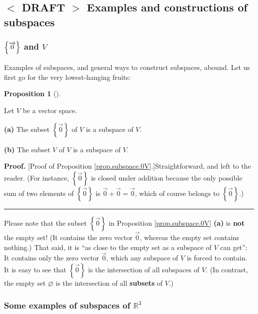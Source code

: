 \documentclass[numbers=enddot,12pt,final,onecolumn,notitlepage]{scrartcl}%
\theoremstyle{definition}
\newtheorem{prop}[theo]{Proposition}
\newenvironment{proposition}[1][]
{\begin{prop}[#1]\begin{leftbar}}
{\end{leftbar}\end{prop}}
\newenvironment{proof}[1][Proof]{\noindent\textbf{#1.} }{\ \rule{0.5em}{0.5em}}
\begin{document}
\subsection{%
$<$%
DRAFT%
$>$
Examples and constructions of subspaces}

\subsubsection{$\left\{  \protect\overrightarrow{0}\right\}  $ and $V$}

Examples of subspaces, and general ways to construct subspaces, abound. Let us
first go for the very lowest-hanging fruits:

\begin{proposition}
\label{prop.subspace.0V}Let $V$ be a vector space.

\textbf{(a)} The subset $\left\{  \overrightarrow{0}\right\}  $ of $V$ is a
subspace of $V$.

\textbf{(b)} The subset $V$ of $V$ is a subspace of $V$.
\end{proposition}

\begin{proof}
[Proof of Proposition \ref{prop.subspace.0V}.]Straightforward, and left to the
reader. (For instance, $\left\{  \overrightarrow{0}\right\}  $ is closed under
addition because the only possible sum of two elements of $\left\{
\overrightarrow{0}\right\}  $ is $\overrightarrow{0}+\overrightarrow{0}%
=\overrightarrow{0}$, which of course belongs to $\left\{  \overrightarrow{0}%
\right\}  $.)
\end{proof}

Please note that the subset $\left\{  \overrightarrow{0}\right\}  $ in
Proposition \ref{prop.subspace.0V} \textbf{(a)} is \textbf{not} the empty set!
(It contains the zero vector $\overrightarrow{0}$, whereas the empty set
contains nothing.) That said, it is \textquotedblleft as close to the empty
set as a subspace of $V$ can get\textquotedblright: It contains only the zero
vector $\overrightarrow{0}$, which any subspace of $V$ is forced to contain.
It is easy to see that $\left\{  \overrightarrow{0}\right\}  $ is the
intersection of all subspaces of $V$. (In contrast, the empty set
$\varnothing$ is the intersection of all \textbf{subsets} of $V$.)

\subsubsection{Some examples of subspaces of $\mathbb{R}^{3}$}
\end{document}

